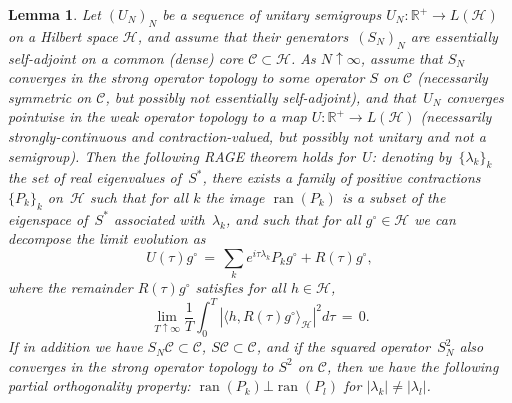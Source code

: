 \documentclass[a4paper,11pt,reqno,noindent]{amsart}
\theoremstyle{plain}
\newtheorem{lem}{Lemma}[section]
\numberwithin{equation}{section}
\newcommand{\R}{\mathbb R}
\newcommand{\Cc}{\mathcal C}
\newcommand{\Hc}{\mathcal H}
\newcommand{\3}{|\!|\!|}
\begin{document}
\begin{lem}\label{lem:RAGE-abs}
Let $(U_N)_N$ be a sequence of unitary semigroups $U_N:\R^+\to L(\Hc)$ on a Hilbert space $\Hc$, and 
assume that their generators~$(S_N)_N$ are essentially self-adjoint on a common (dense) core $\Cc\subset\Hc$. As $N\uparrow\infty$, assume that $S_N$ converges in the strong operator topology to some operator $S$ on $\Cc$ (necessarily symmetric on $\Cc$, but possibly not essentially self-adjoint), and that~$U_N$ converges pointwise in the weak operator topology to a map $U:\R^+\to L(\Hc)$ (necessarily strongly-continuous and contraction-valued, but possibly not unitary and not a semigroup).
Then the following RAGE theorem holds for~$U$: denoting by~$\{\lambda_k\}_k$ the set of real eigenvalues of~$S^*$, there exists a family of positive contractions~$\{P_k\}_k$ on~$\Hc$ such that for all $k$ the image $\operatorname{ran}(P_k)$ is a subset of the eigenspace of~$S^*$ associated with~$\lambda_k$, and such that for all $g^\circ\in\Hc$ we can decompose the limit evolution as
\begin{equation*}
U(\tau)g^\circ\,=\,\sum_ke^{i\tau\lambda_k}P_k g^\circ+R(\tau)g^\circ,
\end{equation*}
where the remainder $R(\tau)g^\circ$ satisfies for all $h\in\Hc$,
\[\lim_{T\uparrow\infty}\frac1T\int_0^T|\langle h,R(\tau)g^\circ\rangle_\Hc|^2d\tau\,=\,0.\]
If in addition we have $S_N\Cc\subset\Cc$, $S\Cc\subset\Cc$, and if the squared operator~$S_N^2$ also converges in the strong operator topology to $S^2$ on $\Cc$, then we have the following partial orthogonality property: $\operatorname{ran}(P_k)\bot \operatorname{ran}(P_l)$ for $|\lambda_k|\ne|\lambda_l|$.
\end{lem}
\end{document}
